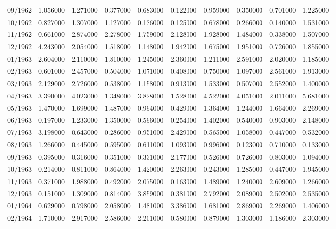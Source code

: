 \begin{tabular}{lrrrrrrrrr}
09/1962 & 1.056000 & 1.271000 & 0.377000 & 0.683000 & 0.122000 & 0.959000 & 0.350000 & 0.701000 & 1.225000 \\
10/1962 & 0.827000 & 1.307000 & 1.127000 & 0.136000 & 0.125000 & 0.678000 & 0.266000 & 0.140000 & 1.531000 \\
11/1962 & 0.661000 & 2.874000 & 2.278000 & 1.759000 & 2.128000 & 1.928000 & 1.484000 & 0.338000 & 1.507000 \\
12/1962 & 4.243000 & 2.054000 & 1.518000 & 1.148000 & 1.942000 & 1.675000 & 1.951000 & 0.726000 & 1.855000 \\
01/1963 & 2.604000 & 2.110000 & 1.810000 & 1.245000 & 2.360000 & 1.211000 & 2.591000 & 2.020000 & 1.185000 \\
02/1963 & 0.601000 & 2.457000 & 0.504000 & 1.071000 & 0.408000 & 0.750000 & 1.097000 & 2.561000 & 1.913000 \\
03/1963 & 2.129000 & 2.726000 & 0.538000 & 1.158000 & 0.913000 & 1.533000 & 0.507000 & 2.552000 & 1.400000 \\
04/1963 & 3.390000 & 4.023000 & 1.348000 & 3.828000 & 1.528000 & 4.522000 & 4.051000 & 2.011000 & 5.681000 \\
05/1963 & 1.470000 & 1.699000 & 1.487000 & 0.994000 & 0.429000 & 1.364000 & 1.244000 & 1.664000 & 2.269000 \\
06/1963 & 0.197000 & 1.233000 & 1.350000 & 0.596000 & 0.254000 & 1.402000 & 0.540000 & 0.903000 & 2.148000 \\
07/1963 & 3.198000 & 0.643000 & 0.286000 & 0.951000 & 2.429000 & 0.565000 & 1.058000 & 0.447000 & 0.532000 \\
08/1963 & 1.266000 & 0.445000 & 0.595000 & 0.611000 & 1.093000 & 0.996000 & 0.123000 & 0.710000 & 0.133000 \\
09/1963 & 0.395000 & 0.316000 & 0.351000 & 0.331000 & 2.177000 & 0.526000 & 0.726000 & 0.803000 & 1.094000 \\
10/1963 & 0.214000 & 0.811000 & 0.864000 & 1.420000 & 2.263000 & 0.243000 & 1.285000 & 0.447000 & 1.945000 \\
11/1963 & 0.371000 & 1.988000 & 0.492000 & 2.075000 & 0.163000 & 1.489000 & 1.240000 & 2.609000 & 1.266000 \\
12/1963 & 0.151000 & 1.309000 & 0.814000 & 3.859000 & 0.381000 & 2.792000 & 2.089000 & 2.502000 & 2.535000 \\
01/1964 & 0.629000 & 0.798000 & 2.058000 & 1.481000 & 3.386000 & 1.681000 & 2.869000 & 2.269000 & 1.406000 \\
02/1964 & 1.710000 & 2.917000 & 2.586000 & 2.201000 & 0.580000 & 0.879000 & 1.303000 & 1.186000 & 2.303000 \\

\end{tabular}
